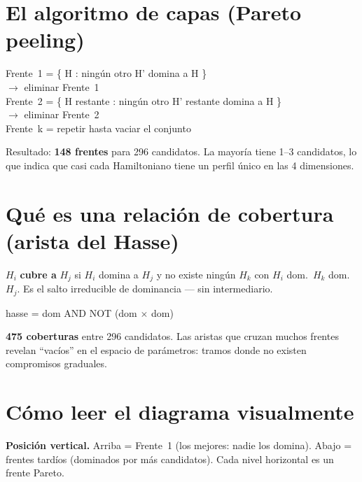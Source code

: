 \documentclass[11pt, a4paper]{article}
\begin{document}
\section{El algoritmo de capas (Pareto peeling)}

\begin{tcolorbox}[codebox]
Frente~1 = \{ H : ning\'un otro H' domina a H \}\\
\phantom{Frente~1 }$\to$ eliminar Frente~1\\[4pt]
Frente~2 = \{ H restante : ning\'un otro H' restante domina a H \}\\
\phantom{Frente~2 }$\to$ eliminar Frente~2\\[4pt]
Frente~k = repetir hasta vaciar el conjunto
\end{tcolorbox}

Resultado: \textbf{148 frentes} para 296 candidatos. La mayor\'ia tiene 1--3
candidatos, lo que indica que casi cada Hamiltoniano tiene un perfil \'unico
en las 4 dimensiones.

\section{Qu\'e es una relaci\'on de cobertura (arista del Hasse)}

$H_i$ \textbf{cubre a} $H_j$ si $H_i$ domina a $H_j$ y no existe ning\'un
$H_k$ con $H_i$ dom.\ $H_k$ dom.\ $H_j$. Es el salto irreducible de
dominancia --- sin intermediario.

\begin{tcolorbox}[codebox]
hasse = dom AND NOT (dom $\times$ dom) 
\end{tcolorbox}

\textbf{475 coberturas} entre 296 candidatos. Las aristas que cruzan muchos
frentes revelan ``vac\'ios'' en el espacio de parámetros: tramos donde no
existen compromisos graduales.

\section{C\'omo leer el diagrama visualmente}

\textbf{Posici\'on vertical.}
Arriba = Frente~1 (los mejores: nadie los domina).
Abajo = frentes tard\'ios (dominados por m\'as candidatos).
Cada nivel horizontal es un frente Pareto.
\end{document}
